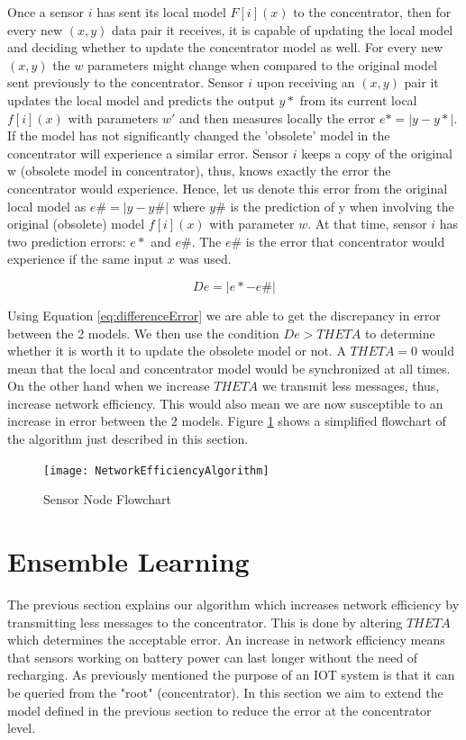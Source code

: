 \documentclass{mproj}
\begin{document}
Once a sensor $i$ has sent its local model $F[i](x)$ to the concentrator, then for every new $(x,y)$ data pair it receives, it is capable of updating the local model and deciding whether to update the concentrator model as well. For every new $(x,y)$ the $w$ parameters might change when compared to the original model sent previously to the concentrator. Sensor $i$ upon receiving an $(x,y)$ pair it updates the local model and predicts the output $y*$ from its current local $f[i](x)$ with parameters $w'$ and then measures locally the error $e* = |y-y*|$. If the model has not significantly changed the 'obsolete' model in the concentrator will experience a similar error. Sensor $i$ keeps a copy of the original w (obsolete model in concentrator), thus, knows exactly the error the concentrator would experience. Hence, let us denote this error from the original local model as $e\# = |y - y\#|$ where $y\#$ is the prediction of y when involving the original (obsolete) model $f[i](x)$ with parameter $w$. At that time, sensor $i$ has two prediction errors: $e*$ and $e\#$. The $e\#$ is the error that concentrator would experience if the same input $x$ was used.

\begin{equation}
\label{eq:differenceError}
De = |e* - e\#|
\end{equation}

Using Equation \ref{eq:differenceError} we are able to get the discrepancy in error between the 2 models. We then use the condition $De > THETA$ to determine whether it is worth it to update the obsolete model or not. A $THETA=0$ would mean that the local and concentrator model would be synchronized at all times. On the other hand when we increase $THETA$ we transmit less messages, thus, increase network efficiency. This would also mean we are now susceptible to an increase in error between the 2 models. Figure \ref{fig:nea} shows a simplified flowchart of the algorithm just described in this section.


\begin{figure}[H]
\caption{Sensor Node Flowchart}
\label{fig:nea}
\centerline{\texttt{[image: NetworkEfficiencyAlgorithm]}}
\end{figure}

\section{Ensemble Learning}
\label{sec:ensembleLearning}
The previous section explains our algorithm which increases network efficiency by transmitting less messages to the concentrator. This is done by altering $THETA$ which determines the acceptable error. An increase in network efficiency means that sensors working on battery power can last longer without the need of recharging. As previously mentioned the purpose of an IOT system is that it can be queried from the "root" (concentrator). In this section we aim to extend the model defined in the previous section to reduce the error at the concentrator level.
\end{document}
